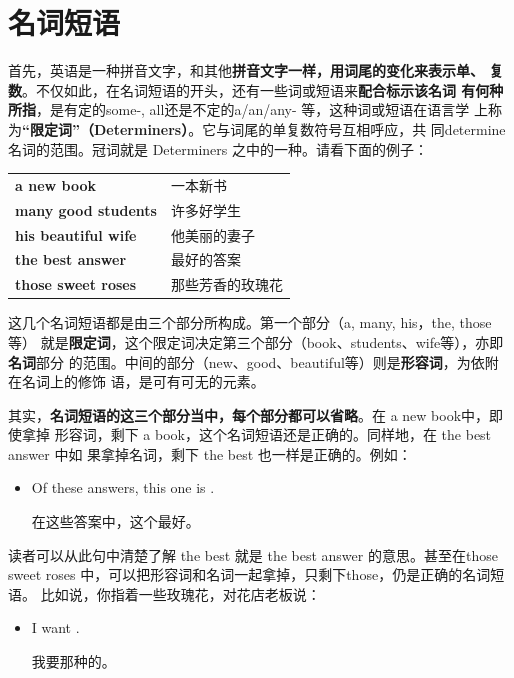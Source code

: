 \section{名词短语}

首先，英语是一种拼音文字，和其他\textbf{拼音文字一样，用词尾的变化来表示单、
  复数}。不仅如此，在名词短语的开头，还有一些词或短语来\textbf{配合标示该名词
  有何种所指}，是有定的some-, all还是不定的a/an/any- 等，这种词或短语在语言学
上称为\textbf{“限定词”（Determiners）}。它与词尾的单复数符号互相呼应，共
同determine 名词的范围。冠词就是 Determiners 之中的一种。请看下面的例子：

\begin{table}[]
  \centering
  \begin{tabular}{ll}
    \textbf{a new book}         & 一本新书     \\
    \textbf{many good  students} & 许多好学生    \\
    \textbf{his beautiful wife} & 他美丽的妻子   \\
    \textbf{the best answer}    & 最好的答案    \\
    \textbf{those sweet roses}  & 那些芳香的玫瑰花
  \end{tabular}
\end{table}

这几个名词短语都是由三个部分所构成。第一个部分（a, many, his，the, those等）
就是\textbf{限定词}，这个限定词决定第三个部分（book、students、wife等），亦即\textbf{名词}部分
的范围。中间的部分（new、good、beautiful等）则是\textbf{形容词}，为依附在名词上的修饰
语，是可有可无的元素。

其实，\textbf{名词短语的这三个部分当中，每个部分都可以省略}。在 a new book中，即使拿掉
形容词，剩下 a book，这个名词短语还是正确的。同样地，在 the best answer 中如
果拿掉名词，剩下 the best 也一样是正确的。例如：
\begin{itemize}
\item Of these answers, this one is .

  在这些答案中，这个最好。
\end{itemize}

读者可以从此句中清楚了解 the best 就是 the best answer 的意思。甚至在those
sweet roses 中，可以把形容词和名词一起拿掉，只剩下those，仍是正确的名词短语。
比如说，你指着一些玫瑰花，对花店老板说：
\begin{itemize}
\item I want .

  我要那种的。
\end{itemize}

